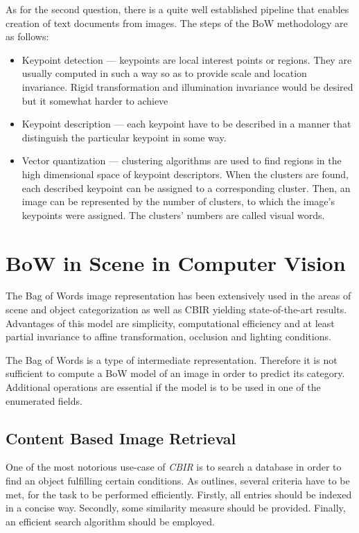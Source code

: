 \documentclass[a4paper,10pt]{article}
\begin{document}
  As for the second question, there is a quite well established pipeline that enables creation of text documents from images. The steps of the BoW methodology are as follows:
  \begin{itemize}
   \item Keypoint detection --- keypoints are local interest points or regions. They are usually computed in such a way so as to provide scale and location invariance. Rigid transformation and illumination invariance would be desired but it somewhat harder to achieve
   \item Keypoint description --- each keypoint have to be described in a manner that distinguish the particular keypoint in some way.
   \item Vector quantization --- clustering algorithms are used to find regions in the high dimensional space of keypoint descriptors. When the clusters are found, each described keypoint can be assigned to a corresponding cluster. Then, an image can be represented by the number of clusters, to which the image's keypoints were assigned. The clusters' numbers are called visual words.
  \end{itemize}
  
\section{BoW in Scene in Computer Vision}

  The Bag of Words image representation has been extensively used in the areas of scene \cite{csurka2004visual,fei2005bayesian, tsai2012bag} and object categorization \cite{zhangcategory} as well as CBIR \cite{li2010investigating,toldo2009bag} yielding state-of-the-art results. Advantages of this model are simplicity, computational efficiency and at least partial invariance to affine transformation, occlusion and lighting conditions. 
  
  The Bag of Words is a type of intermediate representation. Therefore it is not sufficient to compute a BoW model of an image in order to predict its category. Additional operations are essential if the model is to be used in one of the enumerated fields.
  
  \subsection{Content Based Image Retrieval}
  
    One of the most notorious use-case of \emph{CBIR} is to search a database in order to find an object fulfilling certain conditions. As \cite{li2010investigating} outlines, several criteria have to be met, for the task to be performed efficiently. Firstly, all entries should be indexed in a concise way. Secondly, some similarity measure should be provided. Finally, an efficient search algorithm should be employed.
    
\end{document}
